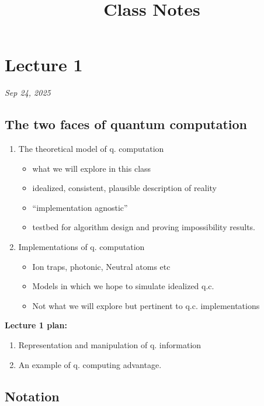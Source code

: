 \documentclass[11pt]{article}
\title{Class Notes}
\author{}
\date{}
\begin{document}
\maketitle
\tableofcontents
\newpage

\section{Lecture 1}
\textit{Sep 24, 2025}

\subsection*{The two faces of quantum computation}

\begin{enumerate}
    \item[\textcircled{1}] The theoretical model of q. computation
    \begin{itemize}
        \item what we will explore in this class
        \item idealized, consistent, plausible description of reality
        \item ``implementation agnostic''
        \item testbed for algorithm design and proving impossibility results.
    \end{itemize}
    \item[\textcircled{2}] Implementations of q. computation
    \begin{itemize}
        \item Ion traps, photonic, Neutral atoms etc
        \item Models in which we hope to simulate idealized q.c.
        \item Not what we will explore but pertinent to q.c. implementations
    \end{itemize}
\end{enumerate}

\textbf{Lecture 1 plan:}
\begin{enumerate}
    \item[\textcircled{1}] Representation and manipulation of q. information
    \item[\textcircled{2}] An example of q. computing advantage.
\end{enumerate}

\subsection*{Notation}
\end{document}
